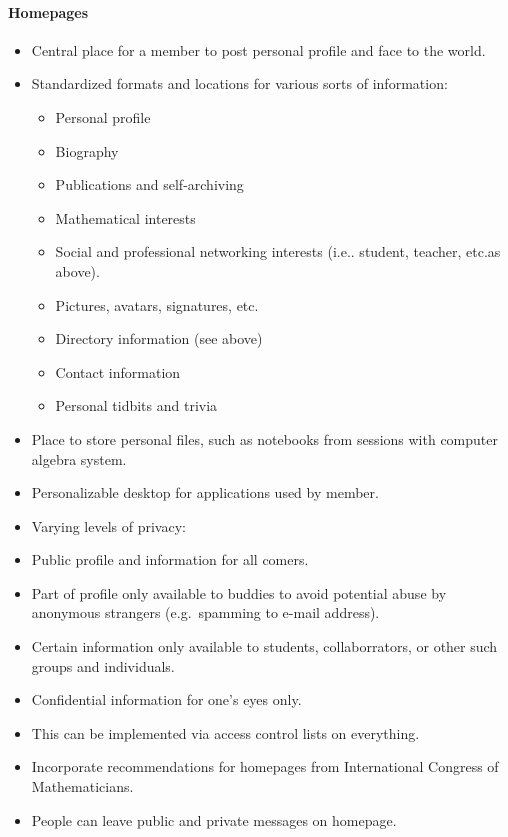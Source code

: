 \begin{itemize}
\begin{itemize}
\paragraph{Homepages}

\begin{itemize}
\item
  Central place for a member to post personal profile and face to the
  world.
\item
  Standardized formats and locations for various sorts of information:
  \begin{itemize}
  \item
    Personal profile 
  \item  
    Biography
  \item  
    Publications and self-archiving
  \item  
    Mathematical interests 
  \item  
    Social and professional networking interests (i.e.. student, 
    teacher, etc.as above). 
  \item  
    Pictures, avatars, signatures, etc. 
  \item  
    Directory information (see above) 
  \item  
    Contact information 
  \item  
    Personal tidbits and trivia
  \end{itemize}  
\item
  Place to store personal files, such as notebooks from sessions with
  computer algebra system.
\item
  Personalizable desktop for applications used by member.
\item
  Varying levels of privacy:
\item
  Public profile and information for all comers.
\item
  Part of profile only available to buddies to avoid potential abuse by
  anonymous strangers (e.g.~spamming to e-mail address).
\item
  Certain information only available to students, collaborrators, or
  other such groups and individuals.
\item
  Confidential information for one's eyes only.
\item
  This can be implemented via access control lists on everything.
\item
  Incorporate recommendations for homepages from International Congress
  of Mathematicians.
\item
  People can leave public and private messages on homepage.

\end{itemize}
\end{itemize}
\end{itemize}
